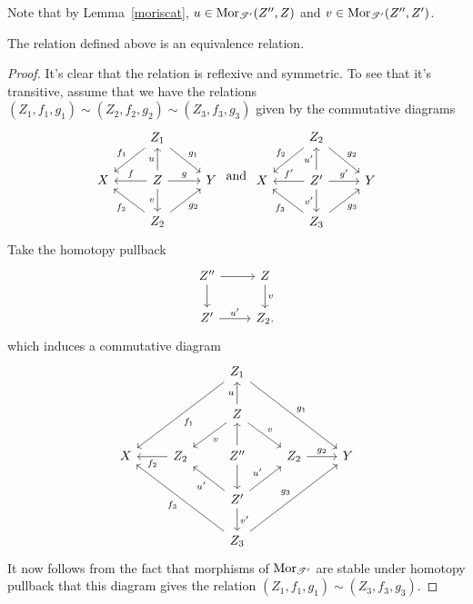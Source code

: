 \documentclass[dissertation.tex]{subfiles}
\begin{document}
\begin{rmk}
  Note that by Lemma~\ref{moriscat}, $u \in \operatorname{Mor}_{\mathscr{T}^\prime}(Z^{\prime\prime},Z)$ and $v \in \operatorname{Mor}_{\mathscr{T}^\prime}(Z^{\prime\prime}, Z^\prime)$.
\end{rmk}

\begin{lem}
  The relation defined above is an equivalence relation.
  
  \begin{proof}
    It's clear that the relation is reflexive and symmetric.
    To see that it's transitive, assume that we have the relations $(Z_1,f_1,g_1) \sim (Z_2, f_2,g_2) \sim (Z_3,f_3,g_3)$
    given by the commutative diagrams
    $$\begin{tikzcd}
      & Z_1\arrow[swap]{ld}{f_1}\arrow{rd}{g_1}\\
      X & Z \arrow[swap]{l}{f}\arrow{r}{g}\arrow{u}{u}\arrow[swap]{d}{v} & Y\\
      & Z_2\arrow{ul}{f_2}\arrow[swap]{ur}{g_2}
    \end{tikzcd}
    \ \text{and}\ 
    \begin{tikzcd}
      & Z_2\arrow[swap]{ld}{f_2}\arrow{rd}{g_2}\\
      X & Z^\prime \arrow[swap]{l}{f^\prime}\arrow{r}{g^\prime}\arrow{u}{u^\prime}\arrow[swap]{d}{v^\prime} & Y\\
      & Z_3\arrow{ul}{f_3}\arrow[swap]{ur}{g_3}
    \end{tikzcd}$$
    Take the homotopy pullback
    $$\begin{tikzcd}
      Z^{\prime\prime} \arrow{r}\arrow{d} & Z\arrow{d}{v}\\
      Z^\prime \arrow{r}{u^\prime} & Z_2.
    \end{tikzcd}$$
    which induces a commutative diagram
    $$\begin{tikzcd}
      & & Z_1 \arrow{lldd}{f_1}\arrow{rrdd}{g_1}\\
      & & Z\arrow{u}{u}\arrow{ld}{v}\arrow{rd}{v}\\
      X & Z_2\arrow{l}{f_2} & Z^{\prime\prime}\arrow{u}\arrow{d} & Z_2\arrow{r}{g_2} & Y\\
      & & Z^\prime\arrow{lu}{u^\prime}\arrow{ru}{u^\prime}\arrow{d}{v^\prime}\\
      & & Z_3\arrow{lluu}{f_3} \arrow{rruu}{g_3}
    \end{tikzcd}$$
    It now follows from the fact that morphisms of $\operatorname{Mor}_{\mathscr{T}^\prime}$ are stable under homotopy pullback that this diagram gives the relation $(Z_1, f_1, g_1) \sim (Z_3, f_3, g_3)$.
  \end{proof}
\end{lem}
\end{document}
